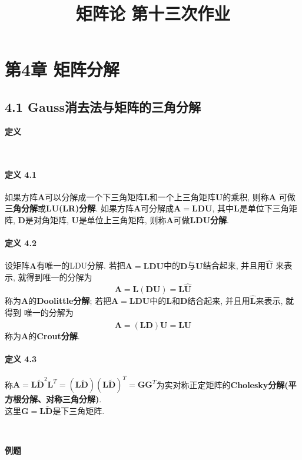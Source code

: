 \documentclass[12pt, a4paper, oneside, fontset=none]{ctexart}
\author{}
\date{}
\title{\vspace{-3em}\textbf{矩阵论 \quad 第十三次作业}\vspace{-3em}}
\begin{document}
\maketitle

\section*{第4章 \quad 矩阵分解}

\subsection*{4.1 \quad Gauss消去法与矩阵的三角分解}

\centerline{\large{\textbf{定义}}} \ \par

\paragraph*{定义 4.1} 如果方阵$\bm{A}$可以分解成一个下三角矩阵$\bm{L}$和一个上三角矩阵$\bm{U}$的乘积, 则称$\bm{A}$
可做\textbf{三角分解}或\textbf{LU(LR)分解}. 如果方阵$\bm{A}$可分解成$\bm{A} = \bm{LDU}$, 其中$\bm{L}$是单位下三角矩阵,
$\bm{D}$是对角矩阵, $\bm{U}$是单位上三角矩阵, 则称$\bm{A}$可做\textbf{LDU分解}.

\paragraph*{定义 4.2} 设矩阵$\bm{A}$有唯一的LDU分解. 若把$\bm{A} = \bm{LDU}$中的$\bm{D}$与$\bm{U}$结合起来, 并且用$\bm{\hat{U}}$
来表示, 就得到唯一的分解为
\[
    \bm{A} = \bm{L(DU)} = \bm{L\hat{U}}
\]
称为$\bm{A}$的\textbf{Doolittle分解}; 若把$\bm{A} = \bm{LDU}$中的$\bm{L}$和$\bm{D}$结合起来, 并且用$\bm{\hat{L}}$来表示, 就得到
唯一的分解为
\[
    \bm{A} = \bm{(LD)U} = \bm{\hat{L}U}
\]
称为$\bm{A}$的\textbf{Crout分解}.

\paragraph*{定义 4.3} 称$\bm{A} = \bm{L\widetilde{D}}^2\bm{L}^T = (\bm{L\widetilde{D}})(\bm{L\widetilde{D}})^T = \bm{GG}^T$为实对称正定矩阵的\textbf{Cholesky分解(平方根分解、对称三角分解)}. \\
这里$\bm{G} = \bm{L\widetilde{D}}$是下三角矩阵.

\par \ \par

\centerline{\large{\textbf{例题}}} \ \par
\end{document}
